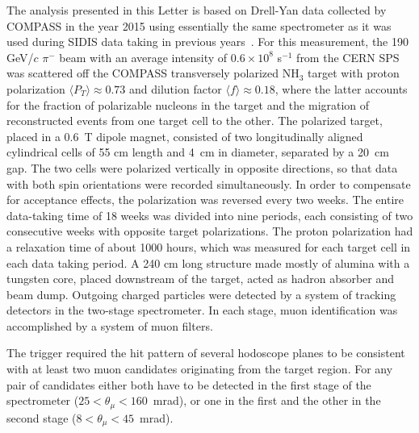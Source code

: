 \documentclass[a4paper,manyauthors,nocleardouble,COMPASS]{cernphprep}
\newcommand{\gvc}{GeV/$c$}
\begin{document}
%
The analysis presented in this Letter is based on Drell-Yan data collected by COMPASS in the year 2015 using essentially the same spectrometer as it was used during SIDIS data taking in previous years~\cite{Abbon:2007pq}. For this measurement, the 190 \gvc\; $\pi^{-}$ beam with an average intensity of $0.6\times10^{8}$ s$^{-1}$ from the CERN SPS was scattered off the COMPASS transversely polarized NH$_3$ target with proton polarization $\langle P_T\rangle\approx0.73$ and
dilution factor $\langle f\rangle\approx 0.18$, where the latter accounts for the fraction of polarizable nucleons in the target and the migration of reconstructed events from one target cell to the other.
The polarized target, placed in a 0.6~T dipole magnet, consisted of two longitudinally aligned cylindrical cells of 55 cm length and 4~cm in diameter, separated
by a 20~cm gap.
The two cells were polarized vertically in opposite directions, so that data with both spin orientations were recorded simultaneously. In order to compensate for acceptance effects, the polarization was reversed every two weeks.
The entire data-taking time of 18 weeks was divided into nine periods, each consisting of two consecutive weeks with opposite target polarizations.
The proton polarization had a relaxation time of about 1000 hours, which was measured for each target cell in each data taking period.
A 240 cm long structure made mostly of alumina with a tungsten core, placed downstream of the target, acted as hadron absorber and beam dump.
Outgoing charged particles were detected by a system of tracking detectors in the two-stage spectrometer. In each stage, muon identification was accomplished by a system of muon filters.

The trigger required the hit pattern of
several hodoscope planes to be consistent with at least two muon candidates originating from the target region. For any pair of candidates either both have to be detected in the first stage of the spectrometer ($25 < \theta_{\mu} < 160$~mrad), or one in the first and the other in the second stage ($8 < \theta_{\mu} < 45$~mrad).

%
%
%
\end{document}
